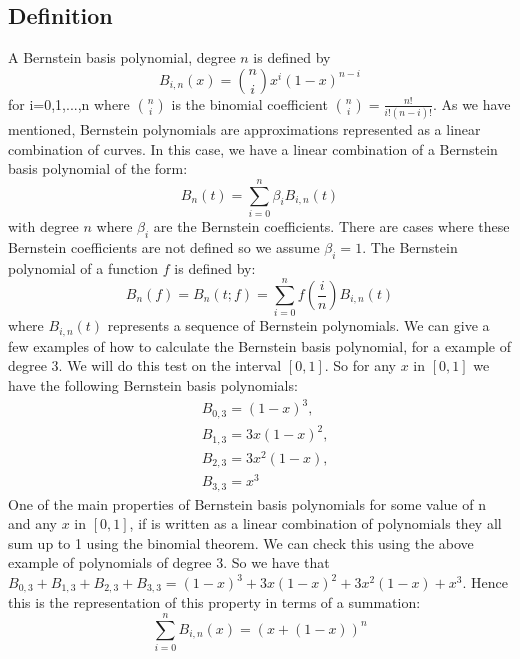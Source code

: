 \documentclass{article}
\begin{document}
\subsection{Definition}
A Bernstein basis polynomial, degree $n$ is defined by
\begin{equation}
 B_{i,n}(x)=\binom{n}{i}x^i(1-x)^{n-i} 
\end{equation}
for i=0,1,...,n where $\binom{n}{i}$ is the binomial coefficient $\binom{n}{i}=\frac{n!}{i!(n-i)!}$.
As we have mentioned, Bernstein polynomials are approximations represented as a linear combination of curves. In this case, we have a linear combination of a Bernstein basis polynomial of the form:
\begin{equation}
B_n(t)=\sum_{i=0}^{n}\beta_iB_{i,n}(t)
\end{equation}
with degree $n$ where $\beta_i$ are the Bernstein coefficients. There are cases where these Bernstein coefficients are not defined so we assume $\beta_i=1$. The Bernstein polynomial of a function $f$ is defined by:
\begin{equation}
B_n(f)=B_n(t;f)=\sum_{i=0}^nf(\frac{i}{n})B_{i,n}(t)   
\end{equation}
 where $B_{i,n}(t)$ represents a sequence of Bernstein polynomials.
We can give a few examples of how to calculate the Bernstein basis polynomial, for a example of degree $3$. We will do this test on the interval $[0,1]$. So for any $x$ in $[0,1]$ we have the following Bernstein basis polynomials:
\begin{align*}
 &B_{0,3}=(1-x)^3,\\   
&B_{1,3}=3x(1-x)^2,\\
&B_{2,3}=3x^2(1-x),\\
&B_{3,3}=x^3
\end{align*}
One of the main properties of Bernstein basis polynomials for some value of n and any $x$ in $[0,1]$, if is written as a linear combination of polynomials they all sum up to 1 using the binomial theorem. We can check this using the above example of polynomials of degree $3$. So we have that $B_{0,3}+B_{1,3}+B_{2,3}+B_{3,3}=(1-x)^3+3x(1-x)^2+3x^2(1-x)+x^3$.
Hence this is the representation of this property in terms of a summation:
\begin{equation}
\sum_{i=0}^nB_{i,n}(x)=(x+(1-x))^n    
\end{equation}
\end{document}
